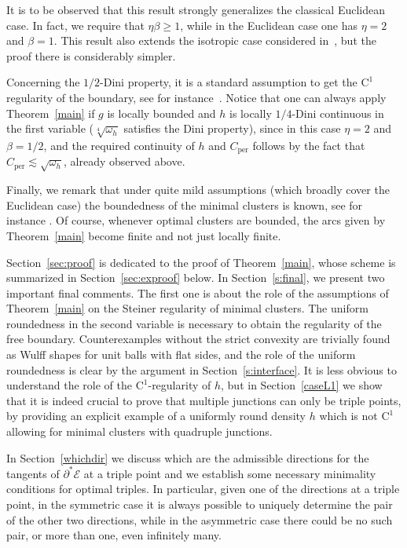 \documentclass[10pt]{amsart}
\newcommand\Ceeb{C_\mathrm{per}}
\theoremstyle{plain}
\theoremstyle{definition}
\begin{document}
It is to be observed that this result strongly generalizes the classical Euclidean case. In fact, we require that $\eta\beta\geq 1$, while in the Euclidean case one has $\eta=2$ and $\beta=1$. This result also extends the isotropic case considered in~\cite{FPS1}, but the proof there is considerably simpler.

Concerning the $1/2$-Dini property, it is a standard assumption to get the $\mathrm{C}^1$ regularity of the boundary, see for instance~\cite{Tam,Mag}. Notice that one can always apply Theorem~\ref{main} if $g$ is locally bounded and $h$ is locally $1/4$-Dini continuous in the first variable (\ie $\sqrt[4]{\omega_h}$ satisfies the Dini property), since in this case $\eta=2$ and $\beta=1/2$, and the required continuity of $h$ and $\Ceeb$ follows by the fact that $\Ceeb\lesssim \sqrt{\omega_h}$, already observed above.

Finally, we remark that under quite mild assumptions (which broadly cover the Euclidean case) the boundedness of the minimal clusters is known, see for instance \hbox{\cite{CP,DFP,PS18,PS19}}. Of course, whenever optimal clusters are bounded, the arcs given by Theorem~\ref{main} become finite and not just locally finite.

Section~\ref{sec:proof} is dedicated to the proof of Theorem~\ref{main}, whose scheme is summarized in Section~\ref{sec:exproof} below. In Section~\ref{s:final}, we present two important final comments. The first one is about the role of the assumptions of Theorem~\ref{main} on the Steiner regularity of minimal clusters. The uniform roundedness in the second variable is necessary to obtain the regularity of the free boundary. Counterexamples without the strict convexity are trivially found as Wulff shapes for unit balls with flat sides, and the role of the uniform roundedness is clear by the argument in Section~\ref{s:interface}. It is less obvious to understand the role of the $\mathrm{C}^1$-regularity of $h$, but in Section~\ref{caseL1} we show that it is indeed crucial to prove that multiple junctions can only be triple points, by providing an explicit example of a uniformly round density $h$ which is not $\mathrm{C}^1$ allowing for minimal clusters with quadruple junctions.

In Section~\ref{whichdir} we discuss which are the admissible directions for the tangents of $\partial^*\mathcal E$ at a triple point and we establish some necessary minimality conditions for optimal triples. In particular, given one of the directions at a triple point, in the symmetric case it is always possible to uniquely determine the pair of the other two directions, while in the asymmetric case there could be no such pair, or more than one, even infinitely many.
\end{document}
